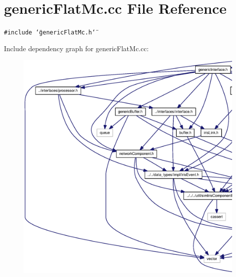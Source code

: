 \section{genericFlatMc.cc File Reference}
\label{genericFlatMc_8cc}
{\tt \#include \char`\"{}genericFlatMc.h\char`\"{}}\par


Include dependency graph for genericFlatMc.cc:\nopagebreak
\begin{figure}[H]
\begin{center}
\leavevmode
\includegraphics[width=420pt]{genericFlatMc_8cc__incl}
\end{center}
\end{figure}
